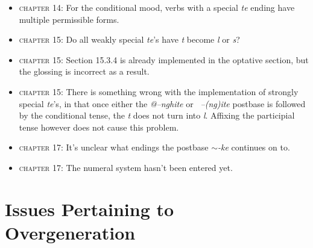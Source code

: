 \documentclass{article}
\begin{document}
\begin{itemize}
\item \textsc{chapter 14}: For the conditional mood, verbs with a special \textit{te} ending have multiple permissible forms.

\item \textsc{chapter 15}: Do all weakly special \textit{te}'s have \textit{t} become \textit{l} or \textit{s}?

\item \textsc{chapter 15}: Section 15.3.4 is already implemented in the optative section, but the glossing is incorrect as a result.

\item \textsc{chapter 15}: There is something wrong with the implementation of strongly special \textit{te}'s, in that once either the \textit{@--nghite} or \textit{~--(ng)ite} postbase is followed by the conditional tense, the \textit{t} does not turn into \textit{l}.
%
Affixing the participial tense however does not cause this problem.

\item \textsc{chapter 17}: It's unclear what endings the postbase \textit{$\sim$-ke} continues on to.

\item \textsc{chapter 17}: The numeral system hasn't been entered yet.

\end{itemize}


\section{Issues Pertaining to Overgeneration}
\end{document}
